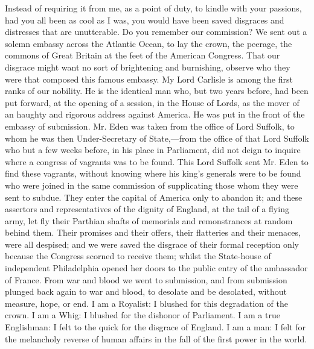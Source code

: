 Instead of requiring it from me, as a point of duty, to kindle with your passions, had you all been as cool as I was, you would have been saved disgraces and distresses that are unutterable. Do you remember our commission? We sent out a solemn embassy across the Atlantic Ocean, to lay the crown, the peerage, the commons of Great Britain at the feet of the American Congress. That our disgrace might want no sort of brightening and burnishing, observe who they were that composed this famous embassy. My Lord Carlisle is among the first ranks of our nobility. He is the identical man who, but two years before, had been put forward, at the opening of a session, in the House of Lords, as the mover of an haughty and rigorous address against America. He was put in the front of the embassy of submission. Mr. Eden was taken from the office of Lord Suffolk, to whom he was then Under-Secretary of State,—from the office of that Lord Suffolk who but a few weeks before, in his place in Parliament, did not deign to inquire where a congress of vagrants was to be found. This Lord Suffolk sent Mr. Eden to find these vagrants, without knowing where his king's generals were to be found who were joined in the same commission of supplicating those whom they were sent to subdue. They enter the capital of America only to abandon it; and these assertors and representatives of the dignity of England, at the tail of a flying army, let fly their Parthian shafts of memorials and remonstrances at random behind them. Their promises and their offers, their flatteries and their menaces, were all despised; and we were saved the disgrace of their formal reception only because the Congress scorned to receive them; whilst the State-house of independent Philadelphia opened her doors to the public entry of the ambassador of France. From war and blood we went to submission, and from submission plunged back again to war and blood, to desolate and be desolated, without measure, hope, or end. I am a Royalist: I blushed for this degradation of the crown. I am a Whig: I blushed for the dishonor of Parliament. I am a true Englishman: I felt to the quick for the disgrace of England. I am a man: I felt for the melancholy reverse of human affairs in the fall of the first power in the world.

